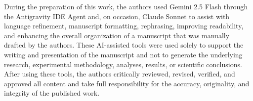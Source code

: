 \documentclass[a4paper,fleqn]{cas-sc}
\begin{document}
During the preparation of this work, the authors used Gemini 2.5 Flash through the Antigravity IDE Agent and, on occasion, Claude Sonnet to assist with language refinement, manuscript formatting, rephrasing, improving readability, and enhancing the overall organization of a manuscript that was manually drafted by the authors. These AI-assisted tools were used solely to support the writing and presentation of the manuscript and not to generate the underlying research, experimental methodology, analyses, results, or scientific conclusions. After using these tools, the authors critically reviewed, revised, verified, and approved all content and take full responsibility for the accuracy, originality, and integrity of the published work.



\end{document}
